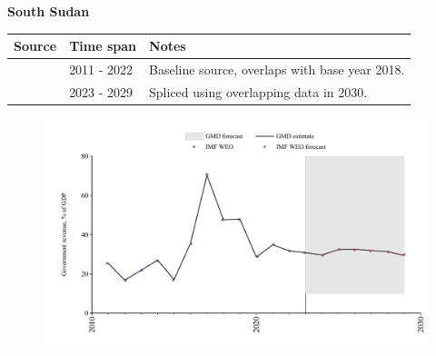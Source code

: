 \documentclass[12pt,a4paper,landscape]{article}
\begin{document}
\begin{adjustbox}{max totalsize={\paperwidth}{\paperheight},center}
\begin{minipage}[t][\textheight][t]{\textwidth}
\vspace*{0.5cm}
{}
\begin{center}
{\Large\bfseries South Sudan}
\end{center}
\vspace{0.5cm}
\begin{table}[H]
\centering
\small
\begin{tabular}{|l|l|l|}
\hline
\textbf{Source} & \textbf{Time span} & \textbf{Notes} \\
\hline
\rowcolor{white}\cite{IMF_WEO}& 2011 - 2022 &Baseline source, overlaps with base year 2018.\\
\rowcolor{lightgray}\cite{IMF_WEO_forecast}& 2023 - 2029 &Spliced using overlapping data in 2030.\\
\hline
\end{tabular}
\end{table}
\begin{figure}[H]
\centering
\includegraphics[width=\textwidth,height=0.6\textheight,keepaspectratio]{graphs/SSD_govrev_GDP.pdf}
\end{figure}
\end{minipage}
\end{adjustbox}
\end{document}
